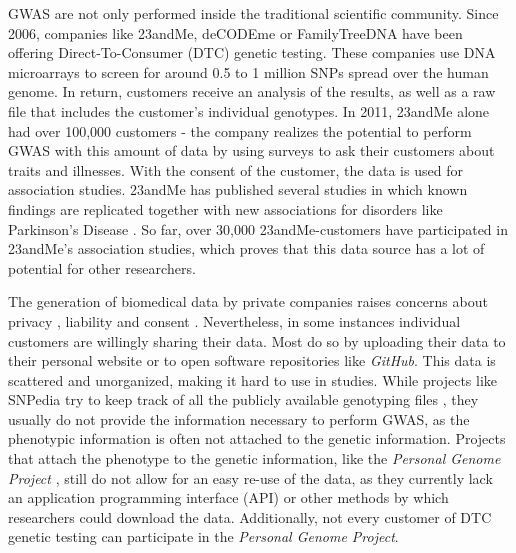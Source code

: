 \documentclass[10pt]{article}
\begin{document}
GWAS are not only performed inside the traditional scientific community. 
Since 2006, companies like 23andMe, deCODEme or FamilyTreeDNA have been offering Direct-To-Consumer (DTC) genetic testing. 
These companies use DNA microarrays to screen for around 0.5 to 1 million SNPs spread over the human genome. In return, customers 
receive an analysis of the results, as well as a raw file that includes the customer's individual genotypes. In 2011, 23andMe 
alone had over 100,000 customers \cite{23andMe2011}
- the company realizes the potential to perform GWAS with this amount of data by using surveys to ask their customers about 
traits and illnesses. With the consent of the customer, the data is used for association studies. 23andMe has published several 
studies in which known findings are replicated together with new associations for disorders like Parkinson's Disease \cite{Eriksson2010, Do2011}. 
So far, over 30,000 23andMe-customers have participated in 23andMe's association studies, which proves that this data source has a lot of potential for other researchers.

The generation of biomedical data by private companies raises concerns about privacy \cite{23andMe2012}, 
liability and consent \cite{Caulfield2011}. 
Nevertheless, in some instances individual customers are willingly sharing their data. Most do so by uploading their data to
their personal website or to open software repositories like \textit{GitHub}. 
This data is scattered and unorganized, making it hard to use in studies. While projects like SNPedia try to keep track of all 
the publicly available genotyping files \cite{Cariaso2011}, they usually do not provide the information necessary to perform GWAS, as the phenotypic information is 
often not attached to the genetic information. Projects that attach the phenotype to the genetic information, 
like the \textit{Personal Genome Project} \cite{Ball24072012}, still do not allow for an easy re-use of the data, as they currently lack an application programming interface (API) 
or other methods by which researchers could download the data. Additionally, not every customer of DTC genetic testing can participate in the \textit{Personal Genome Project}.  
\end{document}

